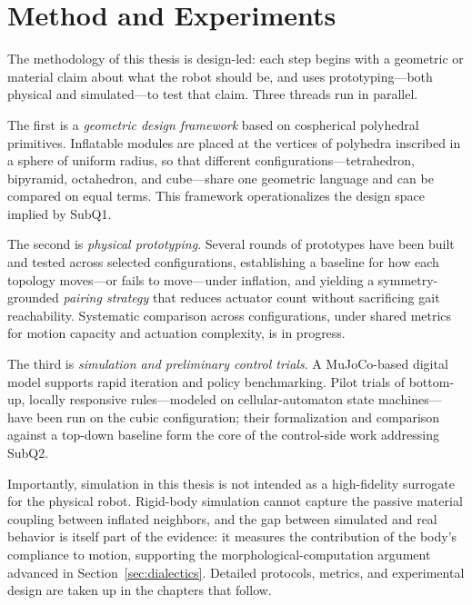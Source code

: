 \section{Method and Experiments}
\label{sec:method}

The methodology of this thesis is design-led: each step begins with a geometric or material claim about what the robot should be, and uses prototyping---both physical and simulated---to test that claim. Three threads run in parallel.

The first is a \textit{geometric design framework} based on cospherical polyhedral primitives. Inflatable modules are placed at the vertices of polyhedra inscribed in a sphere of uniform radius, so that different configurations---tetrahedron, bipyramid, octahedron, and cube---share one geometric language and can be compared on equal terms. This framework operationalizes the design space implied by SubQ1.

The second is \textit{physical prototyping}. Several rounds of prototypes have been built and tested across selected configurations, establishing a baseline for how each topology moves---or fails to move---under inflation, and yielding a symmetry-grounded \textit{pairing strategy} that reduces actuator count without sacrificing gait reachability. Systematic comparison across configurations, under shared metrics for motion capacity and actuation complexity, is in progress.

The third is \textit{simulation and preliminary control trials}. A MuJoCo-based digital model supports rapid iteration and policy benchmarking. Pilot trials of bottom-up, locally responsive rules---modeled on cellular-automaton state machines---have been run on the cubic configuration; their formalization and comparison against a top-down baseline form the core of the control-side work addressing SubQ2.

Importantly, simulation in this thesis is not intended as a high-fidelity surrogate for the physical robot. Rigid-body simulation cannot capture the passive material coupling between inflated neighbors, and the gap between simulated and real behavior is itself part of the evidence: it measures the contribution of the body's compliance to motion, supporting the morphological-computation argument advanced in Section~\ref{sec:dialectics}. Detailed protocols, metrics, and experimental design are taken up in the chapters that follow.
